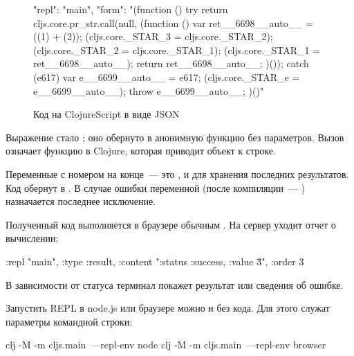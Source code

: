 \begin{figure}[ht!]

\begin{english}
  \begin{json}
{"repl": "main",
 "form": "(function () {
  try {
    return cljs.core.pr_str.call(null, (function () {
      var ret__6698__auto__ = ((1) + (2));
      (cljs.core._STAR_3 = cljs.core._STAR_2);
      (cljs.core._STAR_2 = cljs.core._STAR_1);
      (cljs.core._STAR_1 = ret__6698__auto__);
      return ret__6698__auto__;
    })());
  } catch (e617) {
    var e__6699__auto__ = e617;
    (cljs.core._STAR_e = e__6699__auto__);
    throw e__6699__auto__;
  }
})()"}
  \end{json}
\end{english}

\caption{Код на ClojureScript в виде JSON}
\label{fig:repl-cljs}

\end{figure}

Выражение  стало ; оно обернуто в анонимную функцию без параметров. Вызов  означает функцию  в Clojure, которая приводит объект к строке.

Переменные  с номером на конце~--- это ,  и  для хранения последних результатов. Код обернут в . В случае ошибки переменной  (после компиляции~--- ) назначается последнее исключение.

Полученный код выполняется в браузере обычным . На сервер уходит отчет о вычислении:

\begin{english}
  \begin{clojure}
{:repl "main",
 :type :result,
 :content "{:status :success, :value \"3\"}",
 :order 3}
  \end{clojure}
\end{english}

В зависимости от статуса терминал покажет результат или сведения об ошибке.

Запустить REPL в node.js или браузере можно и без кода. Для этого служат параметры командной строки:

\begin{english}
  \begin{bash}
clj -M -m cljs.main~---repl-env node
clj -M -m cljs.main~---repl-env browser
  \end{bash}
\end{english}

